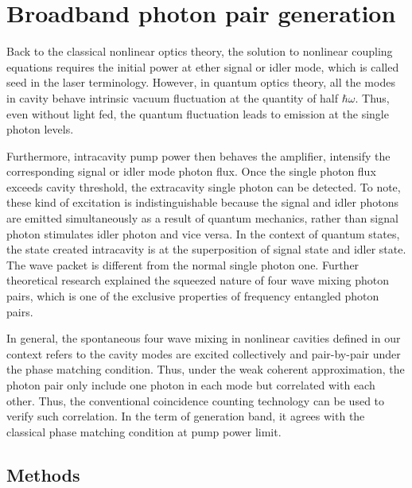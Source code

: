 \chapter{Broadband photon pair generation}

Back to the classical nonlinear optics theory, the solution to nonlinear coupling equations requires the initial power at ether signal or idler mode, which is called seed in the laser terminology. However, in quantum optics theory, all the modes in cavity behave intrinsic vacuum fluctuation at the quantity of half $ \hbar \omega $. Thus, even without light fed, the quantum fluctuation leads to emission at the single photon levels. 

Furthermore, intracavity pump power then behaves the amplifier, intensify the corresponding signal or idler mode photon flux. Once the single photon flux exceeds cavity threshold, the extracavity single photon can be detected. To note, these kind of excitation is indistinguishable because the signal and idler photons are emitted simultaneously as a result of quantum mechanics, rather than signal photon stimulates idler photon and vice versa. In the context of quantum states, the state created intracavity is at the superposition of signal state and idler state. The wave packet is different from the normal single photon one. Further theoretical research \cite{Scully1997} explained the squeezed nature of four wave mixing photon pairs, which is one of the exclusive properties of frequency entangled photon pairs.

In general, the spontaneous four wave mixing in nonlinear cavities defined in our context refers to the cavity modes are excited collectively and pair-by-pair under the phase matching condition. Thus, under the weak coherent approximation, the photon pair only include one photon in each mode but correlated with each other. Thus, the conventional coincidence counting technology can be used to verify such correlation. In the term of generation band, it agrees with the classical phase matching condition at pump power limit.


\section{Methods}

